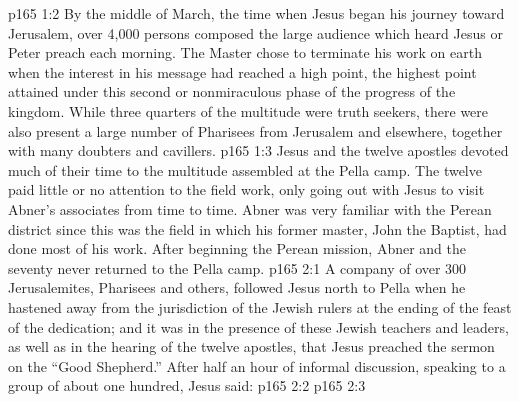 \vs p165 1:2 By the middle of March, the time when Jesus began his journey toward Jerusalem, over 4,000 persons composed the large audience which heard Jesus or Peter preach each morning. The Master chose to terminate his work on earth when the interest in his message had reached a high point, the highest point attained under this second or nonmiraculous phase of the progress of the kingdom. While three quarters of the multitude were truth seekers, there were also present a large number of Pharisees from Jerusalem and elsewhere, together with many doubters and cavillers.
\vs p165 1:3 Jesus and the twelve apostles devoted much of their time to the multitude assembled at the Pella camp. The twelve paid little or no attention to the field work, only going out with Jesus to visit Abner’s associates from time to time. Abner was very familiar with the Perean district since this was the field in which his former master, John the Baptist, had done most of his work. After beginning the Perean mission, Abner and the seventy never returned to the Pella camp.
\vs p165 2:1 A company of over 300 Jerusalemites, Pharisees and others, followed Jesus north to Pella when he hastened away from the jurisdiction of the Jewish rulers at the ending of the feast of the dedication; and it was in the presence of these Jewish teachers and leaders, as well as in the hearing of the twelve apostles, that Jesus preached the sermon on the “Good Shepherd.” After half an hour of informal discussion, speaking to a group of about one hundred, Jesus said:
\vs p165 2:2 \pc {}
\vs p165 2:3 
